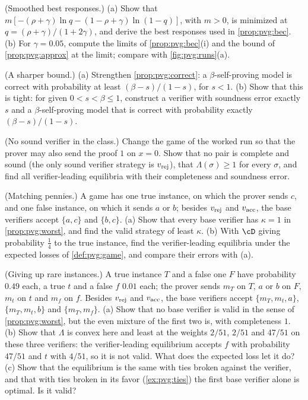\begin{refsection}
\begin{exercises}
\item \consolidation (Smoothed best responses.) (a) Show that $m[-(\rho+\gamma)\ln q-(1-\rho+\gamma)\ln(1-q)]$, with $m>0$, is minimized at $q=(\rho+\gamma)/(1+2\gamma)$, and derive the best responses used in \cref{prop:pvg:bec}. (b) For $\gamma=0.05$, compute the limits of \cref{prop:pvg:bec}(i) and the bound of \cref{prop:pvg:approx} at the limit; compare with \cref{fig:pvg:runs}(a).\label{ex:pvg:smooth}

\item \consolidation (A sharper bound.) (a) Strengthen \cref{prop:pvg:correct}: a $\beta$-self-proving model is correct with probability at least $(\beta-s)/(1-s)$, for $s<1$. (b) Show that this is tight: for given $0<s<\beta\le1$, construct a verifier with soundness error exactly $s$ and a $\beta$-self-proving model that is correct with probability exactly $(\beta-s)/(1-s)$.\label{ex:pvg:tight}

\item \variation (No sound verifier in the class.) Change the game of the worked run so that the prover may also send the proof $1$ on $x=0$. Show that no pair is complete and sound (the only sound verifier strategy is $v_{\mathrm{rej}}$), that $\Lambda(\sigma)\ge1$ for every $\sigma$, and find all verifier-leading equilibria with their completeness and soundness error.\label{ex:pvg:nosound}

\item \variation (Matching pennies.) A game has one true instance, on which the prover sends $c$, and one false instance, on which it sends $a$ or $b$; besides $v_{\mathrm{rej}}$ and $v_{\mathrm{acc}}$, the base verifiers accept $\{a,c\}$ and $\{b,c\}$. (a) Show that every base verifier has $\kappa=1$ in \cref{prop:pvg:worst}, and find the valid strategy of least $\kappa$. (b) With $\cD$ giving probability $\frac14$ to the true instance, find the verifier-leading equilibria under the expected losses of \cref{def:pvg:game}, and compare their errors with (a).\label{ex:pvg:pennies}

\item \variation\hard (Giving up rare instances.) A true instance $T$ and a false one $F$ have probability $0.49$ each, a true $t$ and a false $f$ $0.01$ each; the prover sends $m_T$ on $T$, $a$ or $b$ on $F$, $m_t$ on $t$ and $m_f$ on $f$. Besides $v_{\mathrm{rej}}$ and $v_{\mathrm{acc}}$, the base verifiers accept $\{m_T,m_t,a\}$, $\{m_T,m_t,b\}$ and $\{m_T,m_f\}$. (a) Show that no base verifier is valid in the sense of \cref{prop:pvg:worst}, but the even mixture of the first two is, with completeness $1$. (b) Show that $\Lambda$ is convex here and least at the weights $2/51$, $2/51$ and $47/51$ on these three verifiers: the verifier-leading equilibrium accepts $f$ with probability $47/51$ and $t$ with $4/51$, so it is not valid. What does the expected loss let it do? (c) Show that the equilibrium is the same with ties broken against the verifier, and that with ties broken in its favor (\cref{ex:pvg:ties}) the first base verifier alone is optimal. Is it valid?\label{ex:pvg:giveup}


\end{exercises}
\end{refsection}
